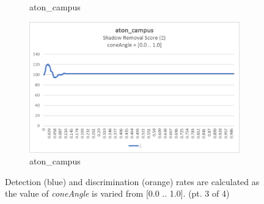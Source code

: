 \begin{appendices}
\begin{figure}
\begin{subfigure}{.45\linewidth}
  \caption{aton\_campus}
\end{subfigure}
\hfill
\begin{subfigure}{.45\linewidth}
  \includegraphics[width=1\linewidth]{figures/appendix/campus_coneAngle_score.jpg}
  \caption{aton\_campus}
\end{subfigure}
\caption{Detection (blue) and discrimination (orange) rates are calculated as the value of \textit{coneAngle} is varied from [0.0 .. 1.0]. (pt. 3 of 4)}

\end{figure}

\begin{figure}


\end{figure}
\end{appendices}
